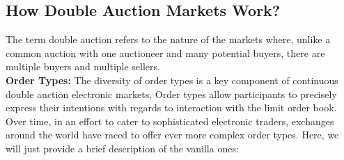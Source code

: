\subsection{How Double Auction Markets Work?}



The term double auction refers to the nature of the markets where, unlike a common auction with one auctioneer and many potential buyers, there are multiple buyers and multiple sellers. \\



\noindent\textbf{Order Types:} The diversity of order types is a key component of continuous double auction electronic markets. Order types allow participants to precisely express their intentions with regards to interaction with the limit order book. Over time, in an effort to cater to sophisticated electronic traders, exchanges around the world have raced to offer ever more complex order types. Here, we will just provide a brief description of the vanilla ones:
